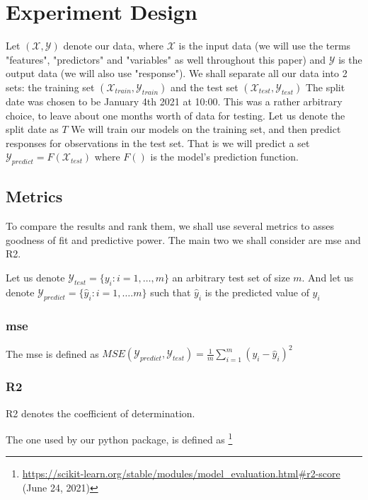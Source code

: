 \chapter{Experiment Design}
\label{chap:experiment_design}
Let $(\mathcal{X},\mathcal{Y})$ denote our data, where $\mathcal{X}$ is the input data (we will use the terms "features", "predictors" and "variables" as well throughout this paper) and $\mathcal{Y}$ is the output data (we will also use "response").
We shall separate all our data into 2 sets: the training set $(\mathcal{X}_{train},\mathcal{Y}_{train})$ and the test set $(\mathcal{X}_{test},\mathcal{Y}_{test})$
The split date was chosen to be January 4th 2021 at 10:00. This was a rather arbitrary choice, to leave about one months worth of data for testing. Let us denote the split date as $T$
We will train our models on the training set, and then predict responses for observations in the test set. That is we will predict a set $\mathcal{Y}_{predict} = F(\mathcal{X}_{test})$ where $F()$ is the model's prediction function.


\section{Metrics}

To compare the results and rank them, we shall use several metrics to asses goodness of fit and predictive power. The main two we shall consider are \acrfull{mse} and  \Gls{R2}.

Let us denote $\mathcal{Y}_{test} = \{ y_i : i=1, \dots, m \}$ an arbitrary test set of size $m$. And let us denote $\mathcal{Y}_{predict} = \{ \hat{y}_i : i=1, \dots. m\}$ such that $\hat{y}_i$ is the predicted value of $y_i$

\subsection{\acrshort{mse}}
The \acrlong{mse} is defined as $MSE(\mathcal{Y}_{predict},\mathcal{Y}_{test}) = \frac{1}{m}\sum_{i=1}^m (y_i - \hat{y}_i)^2$
\subsection{\Gls{R2}}
\Gls{R2} denotes the coefficient of determination.

The one used by our \Gls{python} package, is defined as \footnote{ \url{https://scikit-learn.org/stable/modules/model_evaluation.html\#r2-score } (June 24, 2021)}

